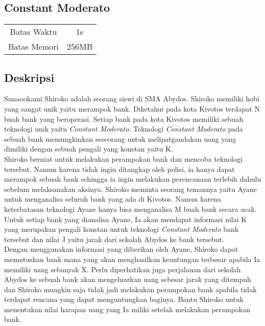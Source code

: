 \documentclass{article}
\begin{document}
\begin{center}

    
    \section*{Constant Moderato} %

    \begin{tabular}{ | c c | }
        \hline
        Batas Waktu  & 1s \\    %
        Batas Memori & 256MB \\  %
        \hline
    \end{tabular}
\end{center}

\subsection*{Deskripsi}

Sunaookami Shiroko adalah seorang siswi di SMA Abydos. Shiroko memiliki hobi yang sangat unik yaitu merampok bank. Diketahui pada kota Kivotos terdapat N buah bank yang beroperasi. Setiap bank pada kota Kivotos memiliki sebuah teknologi unik yaitu \emph{Constant Moderato}. Teknologi \emph{Constant Moderato} pada sebuah bank memungkinkan seseorang untuk melipatgandakan uang yang dimiliki dengan sebuah pengali yang konstan yaitu K. \\

Shiroko berniat untuk melakukan perampokan bank dan mencoba teknologi tersebut. Namun karena tidak ingin ditangkap oleh polisi, ia hanya dapat merampok sebuah bank sehingga ia ingin melakukan perencanaan terlebih dahulu sebelum melaksanakan aksinya. Shiroko meminta seorang temannya yaitu Ayane untuk menganalisa seluruh bank yang ada di Kivotos. Namun karena keterbatasan teknologi Ayane hanya bisa menganalisa M buah bank secara acak. Untuk setiap bank yang dianalisa Ayane, Ia akan mendapat informasi nilai K yang merupakan pengali konstan untuk teknologi \emph{Constant Moderato} bank tersebut dan nilai J yaitu jarak dari sekolah Abydos ke bank tersebut.\\

Dengan menggunakan informasi yang diberikan oleh Ayane, Shiroko dapat memutuskan bank mana yang akan menghasilkan keuntungan terbesar apabila Ia memiliki uang sebanyak X. Perlu diperhatikan juga perjalanan dari sekolah Abydos ke sebuah bank akan mengeluarkan uang sebesar jarak yang ditempuh dan Shiroko mungkin saja tidak jadi melakukan perampokan bank apabila tidak terdapat rencana yang dapat menguntungkan baginya. Bantu Shiroko untuk menentukan nilai harapan uang yang Ia miliki setelah melakukan perampokan bank.\\
\end{document}
